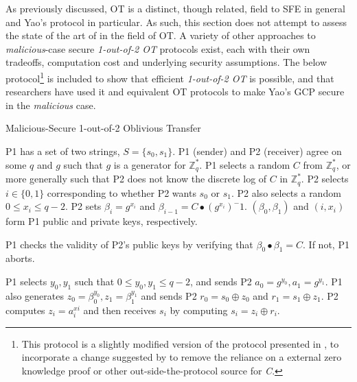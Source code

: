 As previously discussed, \ac{OT} is a distinct, though related, field to \ac{SFE} in general and Yao's protocol in particular.  As such, this section does not attempt to assess the state of the art of in the field of \ac{OT}.  A variety of other approaches to \emph{malicious}-case secure \emph{1-out-of-2 \ac{OT}} protocols exist\cite{naor2001efficient, kiraz2006protocol, goldreich1987play}, each with their own tradeoffs, computation cost and underlying security assumptions.  The below protocol\cite{bellare1990non}\footnote{This protocol is a slightly modified version of the protocol presented in \cite{bellare1990non}, to incorporate a change suggested by \cite{naor2001efficient} to remove the reliance on a external zero knowledge proof or other out-side-the-protocol source for \emph{C}.} is included to show that efficient \emph{1-out-of-2 \ac{OT}} is possible, and that researchers have used it and equivalent \ac{OT} protocols to make Yao's \ac{GCP} secure in the \emph{malicious} case.

\begin{algorithm}[H]
    \caption{Malicious-Secure 1-out-of-2 Oblivious Transfer}
    \label{alg:otmalicious}
    \begin{algorithmic}[1]
        \STATE \ac{P1} has a set of two strings, $S = \{s_0, s_1\}$.
        \STATE \ac{P1} (sender) and \ac{P2} (receiver) agree on some $q$ and $g$ such that $g$ is a generator for $\mathbb{Z}^*_q$.
        \STATE \ac{P1} selects a random $C$ from $\mathbb{Z}^*_q$, or more generally such that \ac{P2} does not know the discrete log of $C$ in $\mathbb{Z}^*_q$.
        \STATE \ac{P2} selects $i \in \{0, 1\}$ corresponding to whether \ac{P2} wants $s_0$ or $s_1$. \ac{P2} also selects a random $0 \leq x_i \leq q-2$.
        \STATE \ac{P2} sets $\beta_i = g^{x_i}$ and $\beta_{i-1} = C \bullet (g^{x_i})^-1$. $(\beta_0, \beta_1)$ and $(i, x_i)$ form \ac{P1} public and private keys, respectively.

        \STATE \ac{P1} checks the validity of \ac{P2}'s public keys by verifying that $\beta_0 \bullet \beta_1 = C$.  If not, \ac{P1} aborts.

        \STATE \ac{P1} selects $y_0, y_1$ such that $0 \leq y_0, y_1 \leq q-2$, and sends \ac{P2} $a_0 = g^{y_0}, a_1 = g^{y_1}$.
        \STATE \ac{P1} also generates $z_0 = \beta^{y_0}_0, z_1 = \beta^{y_1}_1$ and sends \ac{P2} $r_0 = s_0 \oplus z_0$ and $r_1 = s_1 \oplus z_1$.
        \STATE \ac{P2} computes $z_i = a^{xi}_i$ and then receives $s_i$ by computing $s_i = z_i \oplus r_i$.
    \end{algorithmic}
\end{algorithm}

